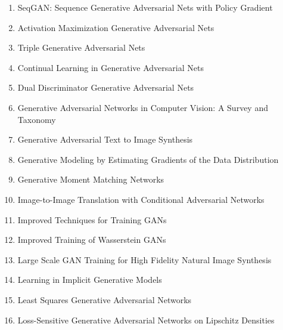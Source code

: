 \documentclass[acmlarge]{acmart}
\begin{document}
\begin{enumerate}
	\item SeqGAN: Sequence Generative Adversarial Nets with Policy Gradient \cite{yu2016seqgan} 

	\item Activation Maximization Generative Adversarial Nets \cite{zhou2017activation} 

	\item Triple Generative Adversarial Nets \cite{li2017triple} 

	\item Continual Learning in Generative Adversarial Nets \cite{seff2017continual} 

	\item Dual Discriminator Generative Adversarial Nets \cite{nguyen2017dual} 

	\item Generative Adversarial Networks in Computer Vision: A Survey and Taxonomy \cite{wang2019generative} 

	\item Generative Adversarial Text to Image Synthesis \cite{reed2016generative} 

	\item Generative Modeling by Estimating Gradients of the Data Distribution \cite{song2019generative} 

	\item Generative Moment Matching Networks \cite{li2015generative} 

	\item Image-to-Image Translation with Conditional Adversarial Networks \cite{isola2016imagetoimage} 

	\item Improved Techniques for Training GANs \cite{salimans2016improved} 

	\item Improved Training of Wasserstein GANs \cite{gulrajani2017improved} 

	\item Large Scale GAN Training for High Fidelity Natural Image Synthesis \cite{brock2018large} 

	\item Learning in Implicit Generative Models \cite{mohamed2016learning} 

	\item Least Squares Generative Adversarial Networks \cite{mao2016squares} 

	\item Loss-Sensitive Generative Adversarial Networks on Lipschitz Densities \cite{qi2017losssensitive} 


\end{enumerate}
\end{document}
